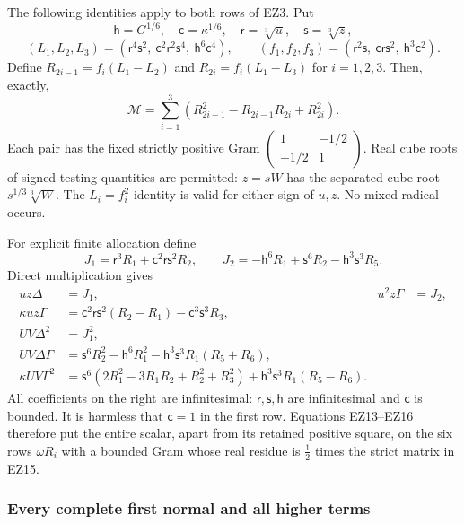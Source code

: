 The following identities apply to both rows of EZ3. Put
\[
 \mathsf h=G^{1/6},\quad\mathsf c=\kappa^{1/6},\quad
 \mathsf r=\sqrt[3]u,\quad\mathsf s=\sqrt[3]z,
\]
\[
 (L_1,L_2,L_3)=
 (\mathsf r^4\mathsf s^2,\
   \mathsf c^2\mathsf r^2\mathsf s^4,\
   \mathsf h^6\mathsf c^4),\qquad
 (f_1,f_2,f_3)=
 (\mathsf r^2\mathsf s,\
   \mathsf c\mathsf r\mathsf s^2,\
   \mathsf h^3\mathsf c^2).
\]
Define $R_{2i-1}=f_i(L_1-L_2)$ and
$R_{2i}=f_i(L_1-L_3)$ for $i=1,2,3$.
Then, exactly,
\[
 \mathcal M=\sum_{i=1}^3
       (R_{2i-1}^2-R_{2i-1}R_{2i}+R_{2i}^2).                  \tag{EZ15}
\]
Each pair has the fixed strictly positive Gram
$\left(\begin{smallmatrix}1&-1/2\\-1/2&1\end{smallmatrix}\right)$.
Real cube roots of signed testing quantities are permitted:
$z=sW$ has the separated cube root
$s^{1/3}\sqrt[3]W$. The $L_i=f_i^2$ identity is valid for
either sign of $u,z$. No mixed radical occurs.

For explicit finite allocation define
\[
 J_1=\mathsf r^3R_1+\mathsf c^2\mathsf r\mathsf s^2R_2,\qquad
 J_2=-\mathsf h^6R_1+\mathsf s^6R_2
                              -\mathsf h^3\mathsf s^3R_5.
\]
Direct multiplication gives
\[
\begin{aligned}
 uz\Delta&=J_1,&u^2z\Gamma&=J_2,\\
 \kappa uz\Gamma
   &=\mathsf c^2\mathsf r\mathsf s^2(R_2-R_1)
                                  -\mathsf c^3\mathsf s^3R_3,\\
 UV\Delta^2&=J_1^2,\\
 UV\Delta\Gamma
   &=\mathsf s^6R_2^2-\mathsf h^6R_1^2
             -\mathsf h^3\mathsf s^3R_1(R_5+R_6),\\
 \kappa UV\Gamma^2
   &=\mathsf s^6(2R_1^2-3R_1R_2+R_2^2+R_3^2)
                      +\mathsf h^3\mathsf s^3R_1(R_5-R_6).
\end{aligned}                                                   \tag{EZ16}
\]
All coefficients on the right are infinitesimal: $\mathsf r,
\mathsf s,\mathsf h$ are infinitesimal and $\mathsf c$ is
bounded. It is harmless that $\mathsf c=1$ in the first row.
Equations EZ13--EZ16 therefore put the entire scalar, apart
from its retained positive square, on the six rows $\omega R_i$
with a bounded Gram whose real residue is $\tfrac12$ times the
strict matrix in EZ15.

\subsubsection*{Every complete first normal and all higher terms}

